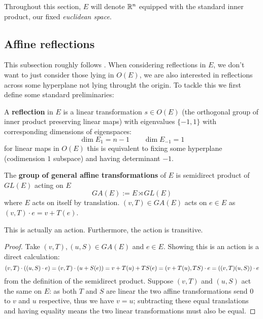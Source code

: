 \documentclass[../main.tex]{subfiles}
\begin{document}
Throughout this section, $E$ will denote $\mathbb{R}^n$ equipped with the standard inner product, our fixed \textit{euclidean space}.

\subsection{Affine reflections}

This subsection roughly follows \cite{Berger2009}. When considering reflections in $E$, we don't want to just consider those lying in $O(E)$, we are also interested in reflections across some hyperplane not lying throught the origin. To tackle this we first define some standard preliminaries:

\begin{definition}
    A \textbf{reflection} in $E$ is a linear transformation $s\in O(E)$ (the orthogonal group of inner product preserving linear maps) with eigenvalues $\{-1,1\}$ with corresponding dimensions of eigenspaces:\[
        \dim{E_1} = n-1 \qquad \dim{E_{-1}} = 1
    \]
    for linear maps in $O(E)$ this is equivalent to fixing some hyperplane (codimension $1$ subspace) and having determinant $-1$.
\end{definition}

\begin{definition}
    The \textbf{group of general affine transformations} of $E$ is semidirect product of $GL(E)$ acting on $E$\[
    GA(E) := E \rtimes GL(E)
    \] where $E$ acts on itself by translation. $(v,T)\in GA(E)$ acts on $e\in E$ as $(v,T)\cdot e = v + T(e)$.
\end{definition}

\begin{proposition}
    This is actually an action. Furthermore, the action is transitive.
    \begin{proof}
        Take $(v,T), (u,S)\in GA(E)$ and $e\in E$. Showing this is an action is a direct calculation: \[
        (v,T) \cdot \left( (u,S) \cdot e \right) = (v,T)\cdot \left( u + S(e) \right) = v + T(u) + TS(e) = (v+T(u),TS)\cdot e = \left( (v,T)(u,S) \right)\cdot e\]
        from the definition of the semidirect product. Suppose $(v,T)$ and $(u,S)$ act the same on $E$: as both $T$ and $S$ are linear the two affine transformations send $0$ to $v$ and $u$ respective, thus we have $v=u$; subtracting these equal translations and having equality means the two linear transformations must also be equal.
    \end{proof}
\end{proposition}
\end{document}

